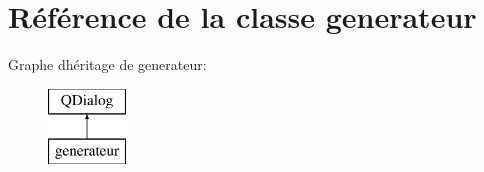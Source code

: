 \hypertarget{classgenerateur}{}\section{Référence de la classe generateur}
\label{classgenerateur}
Graphe d\textquotesingle{}héritage de generateur\+:\begin{figure}[H]
\begin{center}
\leavevmode
\includegraphics[height=2.000000cm]{classgenerateur}
\end{center}
\end{figure}
